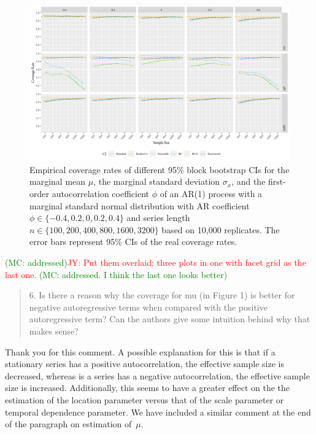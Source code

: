 \documentclass[12pt]{article}
\newcommand{\jy}[1]{\textcolor{red}{JY: #1}}
\newcommand{\mc}[1]{\textcolor{green}{(MC: #1)}}
\newenvironment{comment}%
{\begin{quotation}\noindent\small\it\color{darkblue}\ignorespaces%
}{\end{quotation}}
\begin{document}
\begin{figure}[tbp]
  \centering
  \includegraphics[width=\textwidth]{figures/alt2_plot_norm1}
  \caption{Empirical coverage rates of different 95\% block bootstrap CIs for
    the marginal mean $\mu$, the marginal standard deviation $\sigma_x$, and
    the first-order autocorrelation coefficient $\phi$ of an AR(1) process with 
    a marginal standard 
    normal distribution with AR coefficient
    $\phi \in \{-0.4, 0.2, 0, 0.2, 0.4\}$ and series length
    $n \in \{100, 200, 400, 800, 1600, 3200\}$ based on 10,000 replicates. The
    error bars represent 95\% CIs of the real coverage rates.}
  \label{fig:alt2_norm1}
\end{figure}

\mc{addressed}\jy{Put them overlaid; three plots in one with facet
  grid as the last one.}
  \mc{addressed. I think the last one looks better}

\begin{comment}
6.  Is there a reason why the coverage for mu (in Figure 1) is better for 
negative autoregressive terms when compared with the positive autoregressive 
term? Can the authors give some intuition behind why that makes sense? 
\end{comment}

Thank you for this comment.
A possible explanation for this is that if a 
stationary series has a positive 
autocorrelation, the effective sample
size is decreased, whereas is a series has a negative autocorrelation, the
effective sample size is increased. Additionally, this seems to have a 
greater effect on the the estimation of the location parameter versus that
of the scale parameter or temporal dependence parameter. We have included a 
similar
comment at the end of the paragraph on estimation of~$\mu$.
\end{document}

